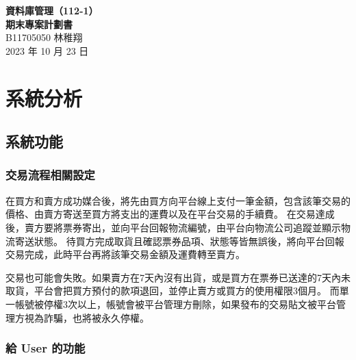 \documentclass[12pt,a4paper]{article}
\begin{document}
\title{}
\author{}
\date{}

\begin{center}
\textbf{\Large 資料庫管理（112-1） \\[5pt]
期末專案計劃書} \\[10pt]
B11705050 林稚翔 \\
2023 年 10 月 23 日
\end{center}





\section{系統分析}


\subsection{系統功能}    

\subsubsection{交易流程相關設定}

在買方和賣方成功媒合後，將先由買方向平台線上支付一筆金額，包含該筆交易的價格、由賣方寄送至買方將支出的運費以及在平台交易的手續費。
在交易達成後，賣方要將票券寄出，並向平台回報物流編號，由平台向物流公司追蹤並顯示物流寄送狀態。
待買方完成取貨且確認票券品項、狀態等皆無誤後，將向平台回報交易完成，此時平台再將該筆交易金額及運費轉至賣方。

交易也可能會失敗。如果賣方在7天內沒有出貨，或是買方在票券已送達的7天內未取貨，平台會把買方預付的款項退回，並停止賣方或買方的使用權限3個月。
而單一帳號被停權3次以上，帳號會被平台管理方刪除，如果發布的交易貼文被平台管理方視為詐騙，也將被永久停權。





\subsubsection{給 User 的功能}
\end{document}
